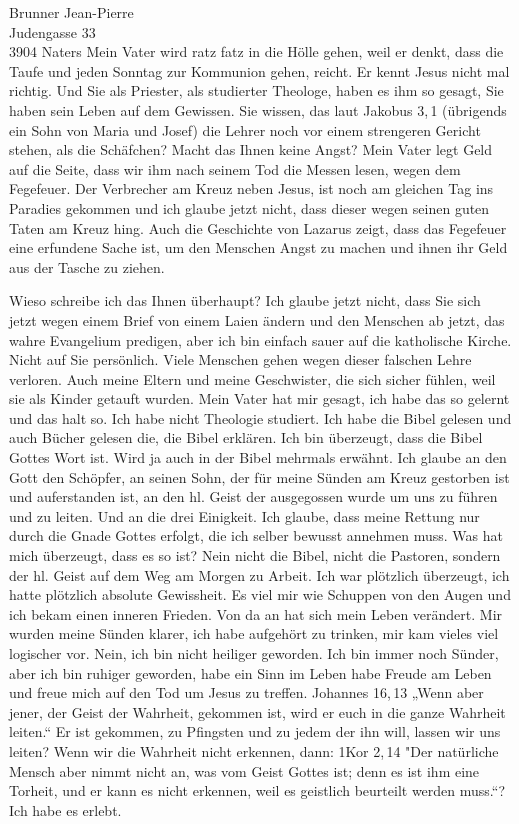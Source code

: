 \documentclass[
    12pt,
    a4paper,
    letter,
    parskip=yes,
    ]{scrlttr2}
\begin{document}
\begin{letter}{
Brunner Jean-Pierre\\
Judengasse 33\\
3904 Naters}
Mein Vater wird ratz fatz in die Hölle gehen, weil er denkt, dass die Taufe und jeden Sonntag zur Kommunion gehen, reicht. Er kennt Jesus nicht mal richtig. Und Sie als Priester, als studierter Theologe, haben es ihm so gesagt, Sie haben sein Leben auf dem Gewissen. Sie wissen, das laut Jakobus 3,\,1 (übrigends ein Sohn von Maria und Josef) die Lehrer noch vor einem strengeren Gericht stehen, als die Schäfchen? Macht das Ihnen keine Angst? Mein Vater legt Geld auf die Seite, dass wir ihm nach seinem Tod die Messen lesen, wegen dem Fegefeuer. Der Verbrecher am Kreuz neben Jesus, ist noch am gleichen Tag ins Paradies gekommen und ich glaube jetzt nicht, dass dieser wegen seinen guten Taten am Kreuz hing. Auch die Geschichte von Lazarus zeigt, dass das Fegefeuer eine erfundene Sache ist, um den Menschen Angst zu machen und ihnen ihr Geld aus der Tasche zu ziehen. 


Wieso schreibe ich das Ihnen überhaupt? Ich glaube jetzt nicht, dass Sie sich jetzt wegen einem Brief von einem Laien ändern und den Menschen ab jetzt, das wahre Evangelium predigen, aber ich bin einfach sauer auf die katholische Kirche. Nicht auf Sie persönlich. Viele Menschen gehen wegen dieser falschen Lehre verloren. Auch meine Eltern und meine Geschwister, die sich sicher fühlen, weil sie als Kinder getauft wurden. Mein Vater hat mir gesagt, ich habe das so gelernt und das halt so. Ich habe nicht Theologie studiert. Ich habe die Bibel gelesen und auch Bücher gelesen die, die Bibel erklären. Ich bin überzeugt, dass die Bibel Gottes Wort ist. Wird ja auch in der Bibel mehrmals erwähnt. Ich glaube an den Gott den Schöpfer, an seinen Sohn, der für meine Sünden am Kreuz gestorben ist und auferstanden ist, an den hl. Geist der ausgegossen wurde um uns zu führen und zu leiten. Und an die drei Einigkeit. Ich glaube, dass meine Rettung nur durch die Gnade Gottes erfolgt, die ich selber bewusst annehmen muss. Was hat mich überzeugt, dass es so ist? Nein nicht die Bibel, nicht die Pastoren, sondern der hl. Geist auf dem Weg am Morgen zu Arbeit. Ich war plötzlich überzeugt, ich hatte plötzlich absolute Gewissheit. Es viel mir wie Schuppen von den Augen und ich bekam einen inneren Frieden. Von da an hat sich mein Leben verändert. Mir wurden meine Sünden klarer, ich habe aufgehört zu trinken, mir kam vieles viel logischer vor. Nein, ich bin nicht heiliger geworden. Ich bin immer noch Sünder, aber ich bin ruhiger geworden, habe ein Sinn im Leben habe Freude am Leben und freue mich auf den Tod um Jesus zu treffen. Johannes 16,\,13 „Wenn aber jener, der Geist der Wahrheit, gekommen ist, wird er euch in die ganze Wahrheit leiten.“ Er ist gekommen, zu Pfingsten und zu jedem der ihn will, lassen wir uns leiten? Wenn wir die Wahrheit nicht erkennen, dann: 1Kor 2,\,14 "Der natürliche Mensch aber nimmt nicht an, was vom Geist Gottes ist; denn es ist ihm eine Torheit, und er kann es nicht erkennen, weil es geistlich beurteilt werden muss.“? Ich habe es erlebt. 



\end{letter}
\end{document}
